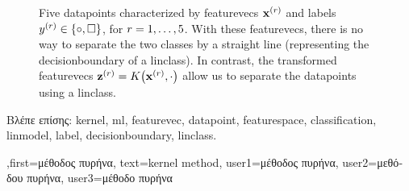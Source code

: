 {{\begin{figure}[H]
\begin{center}
\end{center}
\caption{
Five \gls{datapoint}s characterized by \gls{featurevec}s ${\bf x}^{(r)}$ 
and \gls{label}s $y^{(r)} \in \{ \circ, \square \}$, for $r=1,\ldots,5$. 
With these \gls{featurevec}s, there is no way to separate the two classes 
by a straight line (representing the \gls{decisionboundary} of a \gls{linclass}). 
In contrast, the transformed \gls{featurevec}s ${\bf z}^{(r)} = K\big({\bf x}^{(r)},\cdot\big)$ 
allow us to separate the \gls{datapoint}s using a \gls{linclass}.  \label{fig_linsep_kernel_dict}}
\end{figure}
\foreignlanguage{greek}{Βλέπε επίσης:} \gls{kernel}, \gls{ml}, \gls{featurevec}, \gls{datapoint}, \gls{featurespace}, \gls{classification}, \gls{linmodel}, \gls{label}, \gls{decisionboundary}, \gls{linclass}.
},first={\foreignlanguage{greek}{μέθοδος πυρήνα}},
text={kernel method},
user1={\foreignlanguage{greek}{μέθοδος πυρήνα}}, %
user2={\foreignlanguage{greek}{μεθόδου πυρήνα}}, %
user3={\foreignlanguage{greek}{μέθοδο πυρήνα}} %
}

